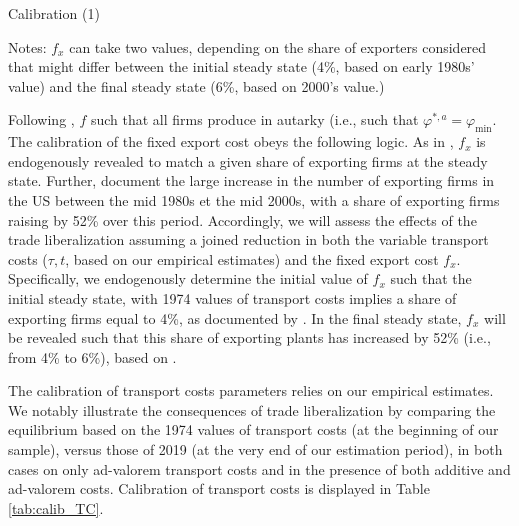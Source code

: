 \documentclass[a4paper,11pt]{article}
\begin{document}
\begin{table}[htbp]
  \centering
  \caption{Calibration (1)} \label{tab:calib_horsTC}
\begin{center}
	
\end{center}
{\parbox[l]{12cm}{ \vspace{4pt}\footnotesize{Notes: $f_x$ can take two values, depending on the share of exporters considered that might differ between the initial steady state (4\%, based on early 1980s' value) and the final steady state (6\%, based on 2000's value.)}}}
\end{table}



Following \cite{ghironi}, $f$ such that all firms produce in autarky (i.e., such that $\varphi^{\ast,a} = \varphi_{\text{min}}$. The calibration of the fixed export cost obeys the following logic. As in \cite{ghironi}, $f_x$ is endogenously revealed to match a given share of exporting firms at the steady state. Further, \cite{Lincoln_McCallum2018} document the large increase in the number of exporting firms in the US between the mid 1980s et the mid 2000s, with a share of exporting firms raising by 52\% over this period. Accordingly, we will assess the effects of the trade liberalization assuming a joined reduction in both the variable transport costs ($\tau, t$, based on our empirical estimates) and the fixed export cost $f_x$. Specifically, we endogenously determine the initial value of $f_x$ such that the initial steady state, with 1974 values of transport costs implies a share of exporting firms equal to 4\%, as documented by \cite{BEJK-AER-03}. In the final steady state, $f_x$ will be revealed such that this share of exporting plants has increased by 52\% (i.e., from 4\% to 6\%), based on \cite{Lincoln_McCallum2018}.\smallskip

The calibration of transport costs parameters relies on our empirical estimates. We notably illustrate the consequences of trade liberalization by comparing the equilibrium based on the 1974 values of transport costs (at the beginning of our sample), versus those of 2019 (at the very end of our estimation period), in both cases on only ad-valorem transport costs and in the presence of both additive and ad-valorem costs. Calibration of transport costs is displayed in Table \ref{tab:calib_TC}.
\end{document}
